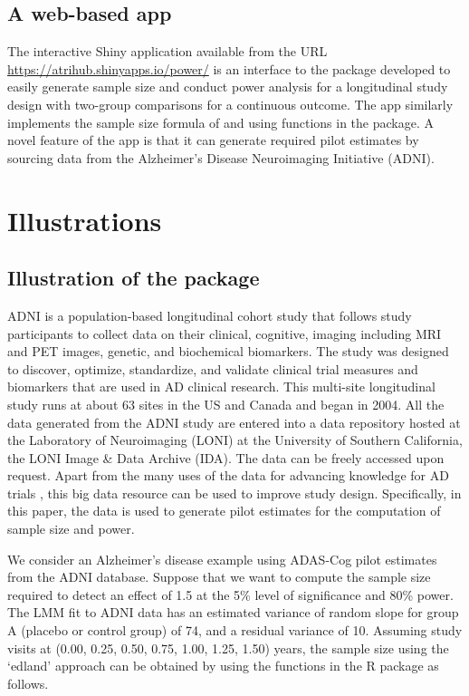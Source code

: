 \subsection{A web-based app}
\label{model4}
The interactive Shiny \citep{RShiny(2021)} application available from the URL \url{https://atrihub.shinyapps.io/power/} is an interface to the  package developed to easily generate sample size and conduct power analysis for a longitudinal study design with two-group comparisons for a continuous outcome. The app similarly implements the sample size formula of \cite{Liu_Liang(1997)} and \cite{Diggle_Liang_Zeger(1994),Diggle_etal(2002)} using functions in the  package. A novel feature of the app is that  it can generate required pilot estimates by sourcing data from the Alzheimer's Disease Neuroimaging Initiative (ADNI).

\section{Illustrations}
\label{sec3}
\subsection{Illustration of the  package}
ADNI is a population-based longitudinal cohort study that follows study participants to collect data on their clinical, cognitive, imaging including MRI and PET images, genetic, and biochemical biomarkers. The study was designed to discover, optimize, standardize, and validate clinical trial measures and biomarkers that are used in AD clinical research. This multi-site longitudinal study runs at about 63 sites in the US and Canada and began in 2004. All the data generated from the ADNI study are entered into a data repository hosted at the Laboratory of Neuroimaging (LONI) at the University of Southern California, the LONI Image \& Data Archive (IDA). The data can be freely accessed upon request. Apart from the many uses of the data for advancing knowledge for AD trials \citep{Weiner_etal(2015)}, this big data resource can be used to improve study design. Specifically, in this paper, the data is used to generate pilot estimates for the computation of sample size and power.

We consider an Alzheimer's disease example using ADAS-Cog \citep{rosen1984alzheimer} pilot estimates from the ADNI database. Suppose that we want to compute the sample size required to detect an effect of 1.5 at the 5\% level of significance and 80\% power. The LMM fit to ADNI data has an estimated variance of random slope for group A (placebo or control group) of 74, and a residual variance of 10. Assuming study visits at (0.00, 0.25, 0.50, 0.75, 1.00, 1.25, 1.50) years, the sample size using the `edland' approach can be obtained by using the  functions in the  R package as follows. 


